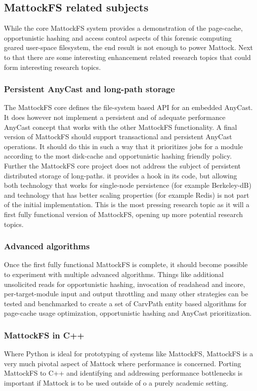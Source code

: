 \subsection{MattockFS related subjects}
While the core MattockFS system provides a demonstration of the page-cache, opportunistic hashing and access control aspects of this forensic computing geared user-space filesystem, the end result is not enough to power Mattock. Next to that there are some interesting enhancement related research topics that could form interesting research topics.
\subsubsection{Persistent AnyCast and long-path storage}
The MattockFS core defines the file-system based API for an embedded AnyCast. It does however not implement a persistent and of adequate performance 
AnyCast concept that works with the other MattockFS functionality. A final version of MattockFS should support transactional and persistent AnyCast operations. It should do this in such a way that it prioritizes jobs for a module according to the most disk-cache and opportunistic hashing friendly policy. Further the MattockFS core project does not address the subject of persistent distributed storage of long-paths. it provides a hook in its code, but allowing both technology that works for single-node persistence (for example Berkeley-dB) and technology that has better scaling properties (for example Redis) is not part of the initial implementation. 
This is the most pressing research topic as it will a first fully functional version of MattockFS, opening up more potential research topics.
\subsubsection{Advanced algorithms}
Once the first fully functional MattockFS is complete, it should become possible to experiment with multiple advanced algorithms. Things like additional unsolicited reads for opportunistic hashing, invocation of readahead and incore, per-target-module input and output throttling and many other strategies can be tested and benchmarked to create a set of CarvPath entity based algorithms for page-cache usage optimization, opportunistic hashing and AnyCast prioritization.
\subsubsection{MattockFS in C++}
Where Python is ideal for prototyping of systems like MattockFS, MattockFS is a very much pivotal aspect of Mattock where performance is concerned. Porting MattockFS to C++ and identifying and addressing performance bottlenecks is important if Mattock is to be used outside of o a purely academic setting.
